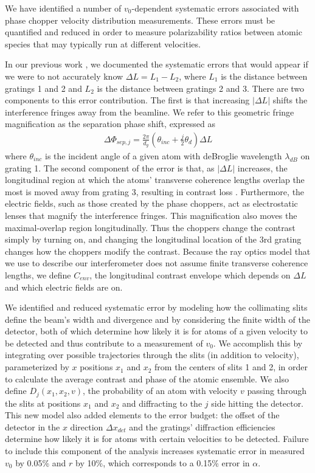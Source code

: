 \documentclass[twocolumn,prl,showpacs,superscriptaddress]{revtex4-1}   %
\begin{document}
We have identified a number of $v_0$-dependent systematic errors associated with phase chopper velocity distribution measurements. These errors must be quantified and reduced in order to measure polarizability ratios between atomic species that may typically run at different velocities.

In our previous work \cite{Hromada2014}, we documented the systematic errors that would appear if we were to not accurately know $\Delta L = L_1 - L_2$, where $L_1$ is the distance between gratings 1 and 2 and $L_2$ is the distance between gratings 2 and 3. There are two components to this error contribution. The first is that increasing $|\Delta L|$ shifts the interference fringes away from the beamline. We refer to this geometric fringe magnification as the separation phase shift, expressed as
\begin{align}
	\Delta\Phi_{sep,j} = \frac{2\pi}{d_g}
	\left(
		\theta_{inc} + \frac{j}{2}\theta_d
	\right) \Delta L
	\label{phiSep}
\end{align}
where $\theta_{inc}$ is the incident angle of a given atom with deBroglie wavelength $\lambda_{dB}$ on grating 1. The second component of the error is that, as $|\Delta L|$ increases, the longitudinal region at which the atoms' transverse coherence lengths overlap the most is moved away from grating 3, resulting in contrast loss \cite{Champenois1999,McMorran2008}. Furthermore, the electric fields, such as those created by the phase choppers, act as electrostatic lenses that magnify the interference fringes. This magnification also moves the maximal-overlap region longitudinally. Thus the choppers change the contrast simply by turning on, and changing the longitudinal location of the 3rd grating changes how the choppers modify the contrast. Because the ray optics model that we use to describe our interferometer does not assume finite transverse coherence lengths, we define $C_{env}$, the longitudinal contrast envelope which depends on $\Delta L$ and which electric fields are on.

We identified and reduced systematic error by modeling how the collimating slits define the beam's width and divergence and by considering the finite width of the detector, both of which determine how likely it is for atoms of a given velocity to be detected and thus contribute to a measurement of $v_0$. 
We accomplish this by integrating over possible trajectories through the slits (in addition to velocity), parameterized by $x$ positions $x_1$ and $x_2$ from the centers of slits 1 and 2, in order to calculate the average contrast and phase of the atomic ensemble. We also define $D_j(x_1,x_2,v)$, the probability of an atom with velocity $v$ passing through the slits at positions $x_1$ and $x_2$ and diffracting to the $j$ side hitting the detector.
This new model also added elements to the error budget: the offset of the detector in the $x$ direction $\Delta x_{det}$ and the gratings' diffraction efficiencies determine how likely it is for atoms with certain velocities to be detected. Failure to include this component of the analysis increases systematic error in measured $v_0$ by 0.05\% and $r$ by 10\%, which corresponds to a 0.15\% error in $\alpha$.
 
\end{document}
